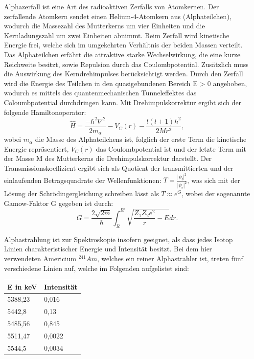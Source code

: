 \documentclass[bigchapter,colorback,accentcolor=tud4b,linedtoc,11pt]{tudreport}
\begin{document}
Alphazerfall ist eine Art des radioaktiven Zerfalls von Atomkernen. Der zerfallende Atomkern sendet einen Helium-4-Atomkern aus (Alphateilchen), wodurch die Massezahl des Mutterkerns um vier Einheiten und die Kernladungszahl um zwei Einheiten abnimmt. Beim Zerfall wird kinetische Energie frei, welche sich im umgekehrten Verhältnis der beiden Massen verteilt. Das Alphateilchen erfährt die attraktive starke Wechselwirkung, die eine kurze Reichweite besitzt, sowie Repulsion durch das Coulombpotential. Zusätzlich muss die Auswirkung des Kerndrehimpulses berücksichtigt werden. Durch den Zerfall wird die Energie des Teilchen in den quasigebundenen Bereich E > 0 angehoben, wodurch es mittels des quantenmechanischen Tunneleffektes das Coloumbpotential durchdringen kann. Mit Drehimpulskorrektur ergibt sich der folgende Hamiltonoperator: 
$$\hat{H} = \frac{-\hbar^2 \nabla^2}{2 m_{\alpha}} - V_C(r) - \frac{l(l+1) \hbar^2}{2 M r^2},$$
wobei $m_{\alpha}$ die Masse des Alphateilchens ist, folglich der erste Term die kinetische Energie repräsentiert, $V_C(r)$ das Coulombpotential ist und der letzte Term mit der Masse M des Mutterkerns die Drehimpulskorrektur darstellt.
Der Transmissionskoeffizient ergibt sich als Quotient der transmittierten und der einlaufenden Betragsquadrate der Wellenfunktionen: $T = \frac{|\psi_t|^2}{|\psi_e|^2}$, was sich mit der Lösung der Schrödingergleichung schreiben lässt als $T \approx e^G$, wobei der sogenannte Gamow-Faktor G gegeben ist durch:
$$G = \frac{2 \sqrt{2 m}}{\hbar}\int_R^{R'} \sqrt{\frac{Z_1Z_2e^2}{r}-E} dr.$$

Alphastrahlung ist zur Spektroskopie insofern geeignet, als dass jedes Isotop Linien charakteristischer Energie und Intensität besitzt. Bei dem hier verwendeten Americium $^{241}Am$, welches ein reiner Alphastrahler ist, treten fünf verschiedene Linien auf, welche im Folgenden aufgelistet sind: 

\begin{center}
  \begin{tabular}{|p{5cm}|p{5cm}|}
    \hline
    E in keV & Intensität \\ \hline
    5388,23  & 0,016      \\ \hline
    5442,8   & 0,13       \\ \hline
    5485,56  & 0,845      \\ \hline
    5511,47  & 0,0022     \\ \hline
    5544,5   & 0,0034     \\ \hline
        \end{tabular}
\end{center}
\end{document}
